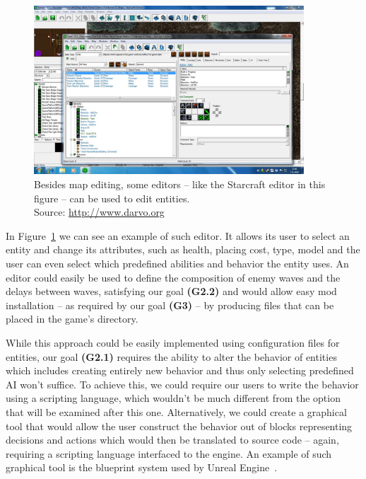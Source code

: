 \begin{figure}[H]
    \centering
    \includegraphics[width=0.9\textwidth]{../img/sc_editor.jpg}
    \caption{Besides map editing, some editors -- like the Starcraft editor in this figure -- can be used to edit entities.
             \\Source: \href{http://www.darvo.org/images/Tutorials\%20Starcraft\%202/Adding\%20Units\%20to\%20a\%20Building\%20part\%201.jpg}
             {http://www.darvo.org}}
    \label{sc-editor}
\end{figure}

In Figure~\ref{sc-editor} we can see an example of such editor.
It allows its user to select an entity and change its attributes, such as health, placing cost, type, model and the user can even 
select which predefined abilities and behavior the entity uses. An editor could easily be used to define the composition of enemy
waves and the delays between waves, satisfying our goal \textbf{(G2.2)} and would allow easy mod installation -- as required by our goal
\textbf{(G3)} -- by producing files that can be placed in the game's directory.

While this approach could be easily implemented using configuration files for entities, our goal \textbf{(G2.1)} requires the ability
to alter the behavior of entities which includes creating entirely new behavior and thus only selecting predefined AI won't suffice.
To achieve this, we could require our users to write the behavior using a scripting language, which wouldn't be much different
from the option that will be examined after this one. Alternatively, we could create a graphical tool that would allow the user
construct the behavior out of blocks
representing decisions and actions which would then be translated to source code -- again, requiring a scripting language interfaced
to the engine. An example of such graphical tool is the blueprint system used by Unreal Engine~\cite{UE}.

